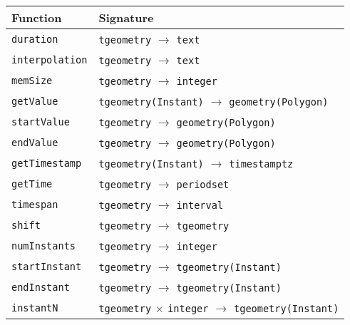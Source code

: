 \label{appendix:complete_funct_tables}

\begin{table}[htbp]
\begin{subtable}{1\textwidth}
\centering
    \begin{tabularx}{\textwidth}{|l|X|}
        \hline
        \textbf{Function}   & \textbf{Signature} \\ 
        \hline
        \lstinline+duration+            & \lstinline+tgeometry+ $\rightarrow$ \lstinline+text+\\
        \hline
        \lstinline+interpolation+       & \lstinline+tgeometry+ $\rightarrow$ \lstinline+text+\\
        \hline
        \lstinline+memSize+             & \lstinline+tgeometry+ $\rightarrow$ \lstinline+integer+ \\
        \hline
        \lstinline+getValue+            & \lstinline+tgeometry(Instant)+ $\rightarrow$ \lstinline+geometry(Polygon)+ \\
        \hline
        \lstinline+startValue+          & \lstinline+tgeometry+ $\rightarrow$ \lstinline+geometry(Polygon)+ \\
        \hline
        \lstinline+endValue+            & \lstinline+tgeometry+ $\rightarrow$ \lstinline+geometry(Polygon)+ \\
        \hline
        \lstinline+getTimestamp+        & \lstinline+tgeometry(Instant)+ $\rightarrow$ \lstinline+timestamptz+ \\
        \hline
        \lstinline+getTime+             & \lstinline+tgeometry+ $\rightarrow$ \lstinline+periodset+ \\
        \hline
        \lstinline+timespan+            & \lstinline+tgeometry+ $\rightarrow$ \lstinline+interval+ \\
        \hline
        \lstinline+shift+               & \lstinline+tgeometry+ $\rightarrow$ \lstinline+tgeometry+ \\
        \hline
        \lstinline+numInstants+         & \lstinline+tgeometry+ $\rightarrow$ \lstinline+integer+ \\
        \hline
        \lstinline+startInstant+        & \lstinline+tgeometry+ $\rightarrow$ \lstinline+tgeometry(Instant)+ \\
        \hline
        \lstinline+endInstant+          & \lstinline+tgeometry+ $\rightarrow$ \lstinline+tgeometry(Instant)+ \\
        \hline
        \lstinline+instantN+            & \lstinline+tgeometry+ $\times$ \lstinline+integer+ $\rightarrow$ \lstinline+tgeometry(Instant)+ \\

\end{tabularx}
\end{subtable}
\end{table}
